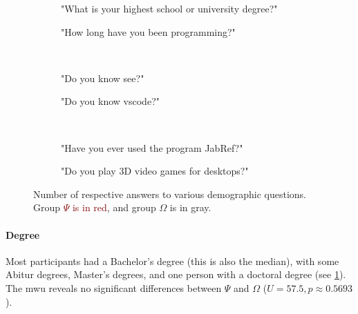 \documentclass[../thesis]{subfiles}
\begin{document}
\begin{figure}
	\begin{subfigure}[T]{0.55\textwidth}
		\caption{"What is your highest school or university degree?"\label{fig:degreebar}}
	\end{subfigure}\hfill
	\begin{subfigure}[T]{0.45\textwidth}
		\caption{"How long have you been programming?"\label{fig:programmingbar}}
	\end{subfigure}\\
	\begin{subfigure}[T]{0.55\textwidth}
		\caption{"Do you know \gls{see}?"\label{fig:knowseebar}}
	\end{subfigure}\hfill
	\begin{subfigure}[T]{0.45\textwidth}
		\caption{"Do you know \gls{vscode}?"\label{fig:knowvsbar}}
	\end{subfigure}\\
	\begin{subfigure}[T]{0.55\textwidth}
		\caption{"Have you ever used the program JabRef?"\label{fig:knowjabrefbar}}
	\end{subfigure}\hfill
	\begin{subfigure}[T]{0.45\textwidth}
		\caption{"Do you play 3D video games for desktops?"\label{fig:knowgamebar}}
	\end{subfigure}
	\caption{Number of respective answers to various demographic questions.\\
		Group \textcolor{Maroon}{$\Psi$ is in red}, and group \textcolor{Gray!50!black}{$\Omega$ is in gray}.}\label{fig:demobars}
\end{figure}

\paragraph{Degree}
Most participants had a Bachelor's degree (this is also the median), with some Abitur degrees, Master's degrees, and one person with a doctoral degree (see \cref{fig:degreebar}).
The \gls{mwu} reveals no significant differences between $\Psi$ and $\Omega$ ($U = 57.5, p \approx 0.5693$).
\end{document}
